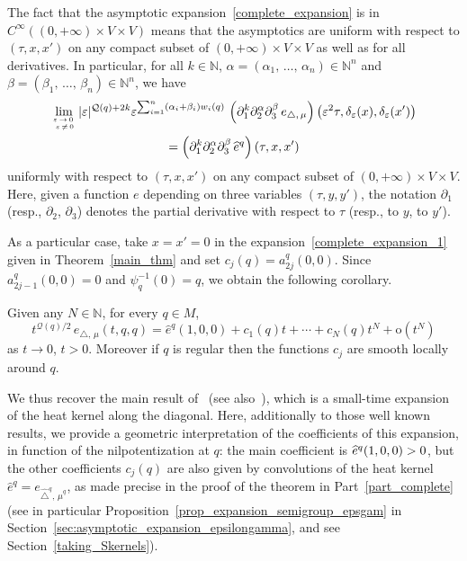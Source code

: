 \documentclass[10pt]{amsart}
\theoremstyle{definition}\newtheorem{defi}[theo]{Definition}\newtheorem{rema}[theo]{Remark}\newtheorem{exam}[theo]{Example}\newtheorem{exem}[theo]{Example}\newtheorem{nota}[theo]{Notation}
\newcommand*\N{\mathbb{N}}
\newcommand{\calQ}{\mathcal{Q}}
\newcommand{\rmo}{\mathrm{o}}
\begin{document}
The fact that the asymptotic expansion~\eqref{complete_expansion} is in $C^\infty((0,+\infty)\times V\times V)$ means that the asymptotics are uniform with respect to $(\tau,x,x')$ on any compact subset of $(0,+\infty)\times V\times V$ as well as for all derivatives. In particular, for all $k\in\N$, $\alpha=(\alpha_1,\,\ldots,\,\alpha_n)\in\N^n$ and $\beta=(\beta_1,\,\ldots,\,\beta_n)\in\N^n$, we have
\begin{multline*}
\lim_{\varepsilon\,\rightarrow\,0\,\atop\,\varepsilon\,\neq\,0} \vert\varepsilon\vert^{\calQ(q)+2k} \varepsilon^{\sum_{i=1}^n (\alpha_i+\beta_i)w_i(q)}\, \left(\partial_1^k \partial_2^\alpha \partial_{3}^\beta \, e_{\triangle,\,\mu}\right) \left(\varepsilon^2 \tau,\delta_\varepsilon(x),\delta_\varepsilon(x')\right)\\
 = \left(\partial_1^k \partial_2^\alpha \partial_{3}^\beta \, \widehat{e}^{q}\right) (\tau,x,x')
\end{multline*}
uniformly with respect to $(\tau,x,x')$ on any compact subset of $(0,+\infty)\times V\times V$. Here, given a function $e$ depending on three variables $(\tau,y,y')$, the notation $\partial_1$ (resp., $\partial_2$, $\partial_3$) denotes the partial derivative with respect to $\tau$ (resp., to $y$, to $y'$).


As a particular case, take $x=x'=0$ in the expansion~\eqref{complete_expansion_1} given in Theorem~\ref{main_thm} and set $c_j(q) = a_{2j}^{q}(0,0)$. Since $a_{2j-1}^{q}(0,0)=0$ and $\psi_{q}^{-1}(0)=q$, we obtain the following corollary.

\begin{coro}
Given any $N\in\N$, for every $q\in M$,
\[
t^{\calQ(q)/2}\, e_{\triangle,\,\mu}(t,q,q) = \widehat{e}^{q}(1,0,0) + c_1(q) t + \cdots + c_N(q) t^N + \rmo\left(t^{N}\right)
\]
as $t\rightarrow 0$, $t>0$. Moreover if $q$ is regular then the functions $c_j$ are smooth locally around $q$.
\end{coro}

We thus recover the main result of~\cite{BenArous_AIF1989} (see also~\cite{Metivier1976}), which is a small-time expansion of the heat kernel along the diagonal. Here, additionally to those well known results, we provide a geometric interpretation of the coefficients of this expansion, in function of the nilpotentization at $q$: the main coefficient is $\widehat{e}^{q}(1,0,0)\linebreak>0$, but the other coefficients $c_j(q)$ are also given by convolutions of the heat kernel $\widehat{e}^{q}=e_{\widehat{\triangle}^{q},\,\widehat{\mu}^{q}}$, as made precise in the proof of the theorem in Part~\ref{part_complete} (see in particular Proposition~\ref{prop_expansion_semigroup_epsgam} in Section~\ref{sec:asymptotic_expansion_epsilongamma}, and see Section~\ref{taking_Skernels}).
\end{document}
